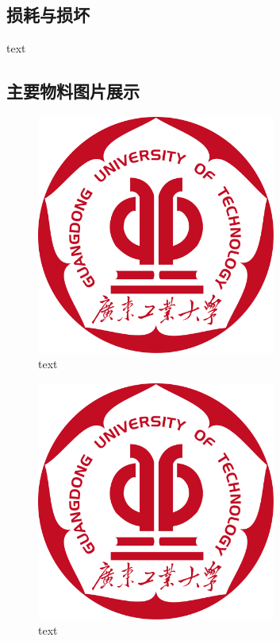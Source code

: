 \subsection{损耗与损坏}
text

\subsection{主要物料图片展示}
\begin{figure}[h]
    \centering
    \includegraphics[width=0.7\textwidth]{figures/logo.pdf}
    \caption{text}
\end{figure}

\begin{figure}[h]
    \centering
    \includegraphics[width=0.7\textwidth]{figures/logo.pdf}
    \caption{text}
\end{figure}

